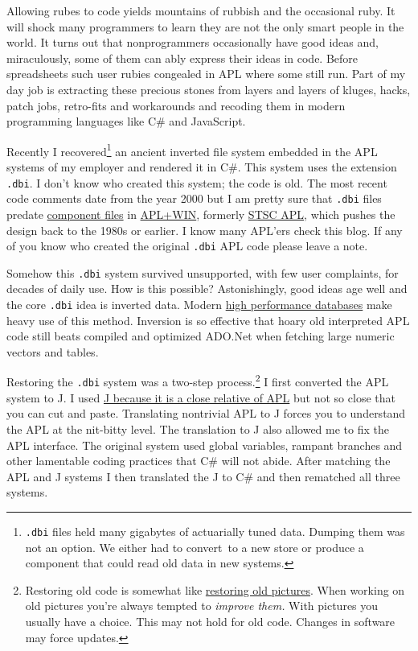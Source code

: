 Allowing rubes to code yields mountains of rubbish and the occasional
ruby. It will shock many programmers to learn they are not the only
smart people in the world. It turns out that nonprogrammers occasionally
have good ideas and, miraculously, some of them can ably express their
ideas in code. Before spreadsheets such user rubies congealed in APL
where some still run. Part of my day job is extracting these precious
stones from layers and layers of kluges, hacks, patch jobs, retro-fits
and workarounds and recoding them in modern programming languages like
C\# and JavaScript.

Recently I recovered\footnote{
\texttt{.dbi} files held many gigabytes of actuarially tuned data.
  Dumping them was not an option. We either had to convert~to a new
  store or produce a component that could read old data in new
  systems.
} an ancient
inverted file system embedded in the APL systems of my employer and
rendered it in C\#. This system uses the extension \texttt{.dbi}. I
don't know who created this system; the code is old. The most recent
code comments date from the year 2000 but I am pretty sure that
\texttt{.dbi} files predate
\href{http://dl.acm.org/citation.cfm?id=28339}{component files} in
\href{http://www.apl2000.com/}{APL+WIN}, formerly
\href{https://en.wikipedia.org/wiki/Scientific\_Time\_Sharing\_Corporation}{STSC
APL}, which pushes the design back to the 1980s or earlier. I know many
APL'ers check this blog. If any of you know who created the original
\texttt{.dbi} APL code please leave a note.

Somehow this \texttt{.dbi} system survived unsupported, with few user
complaints, for decades of daily use. How is this possible?
Astonishingly, good ideas age well and the core \texttt{.dbi} idea is
inverted data. Modern \href{http://kx.com/}{high performance databases}
make heavy use of this method. Inversion is so effective that hoary old
interpreted APL code still beats compiled and optimized ADO.Net when
fetching large numeric vectors and tables.

Restoring the \texttt{.dbi} system was a two-step
process.\footnote{
Restoring old code is somewhat like
  \href{http://conceptcontrol.smugmug.com/Themes/Manipulations/Restorations-1}{restoring
  old pictures}. When working on old pictures you're always tempted to
  \emph{improve them.} With pictures you usually have a choice. This may
  not hold for old code. Changes in software may force
  updates.
} I first converted the APL
system to J. I used \href{http://www.jsoftware.com/jwiki/FrontPage}{J
because it is a close relative of APL} but not so close that you can cut
and paste. Translating nontrivial APL to J forces you to understand the
APL at the nit-bitty level. The translation to J also allowed me to fix
the APL interface. The original system used global variables, rampant
branches and other lamentable coding practices that C\# will not abide.
After matching the APL and J systems I then translated the J to C\# and
then rematched all three systems.


